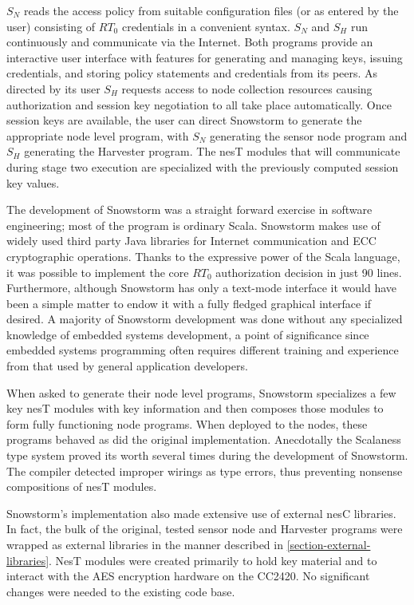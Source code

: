 $S_N$ reads the access policy from suitable configuration files (or as entered by the user)
consisting of $RT_0$ credentials in a convenient syntax. $S_N$ and $S_H$ run continuously and
communicate via the Internet. Both programs provide an interactive user interface with features
for generating and managing keys, issuing credentials, and storing policy statements and
credentials from its peers. As directed by its user $S_H$ requests access to node collection
resources causing authorization and session key negotiation to all take place automatically.
Once session keys are available, the user can direct Snowstorm to generate the appropriate node
level program, with $S_N$ generating the sensor node program and $S_H$ generating the Harvester
program. The nesT modules that will communicate during stage two execution are specialized with
the previously computed session key values.

The development of Snowstorm was a straight forward exercise in software engineering; most of
the program is ordinary Scala. Snowstorm makes use of widely used third party Java libraries for
Internet communication and ECC cryptographic operations. Thanks to the expressive power of the
Scala language, it was possible to implement the core $RT_0$ authorization decision in just 90
lines. Furthermore, although Snowstorm has only a text-mode interface it would have been a
simple matter to endow it with a fully fledged graphical interface if desired. A majority of
Snowstorm development was done without any specialized knowledge of embedded systems
development, a point of significance since embedded systems programming often requires different
training and experience from that used by general application developers.

When asked to generate their node level programs, Snowstorm specializes a few key nesT modules
with key information and then composes those modules to form  fully functioning node programs.
When deployed to the nodes, these programs behaved as did the original implementation.
Anecdotally the Scalaness type system proved its worth several times during the development of
Snowstorm. The compiler detected improper wirings as type errors, thus preventing nonsense
compositions of nesT modules. 

Snowstorm's implementation also made extensive use of external nesC libraries. In fact, the bulk
of the original, tested sensor node and Harvester programs were wrapped as external libraries in
the manner described in \autoref{section-external-libraries}. NesT modules were created
primarily to hold key material and to interact with the AES encryption hardware on the CC2420.
No significant changes were needed to the existing code base.

